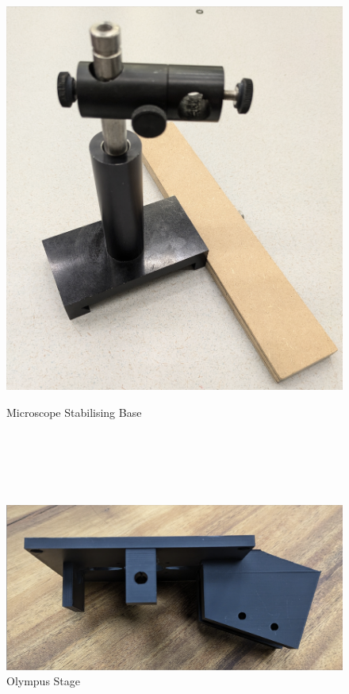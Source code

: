 \documentclass[runningheads]{llncs}
\begin{document}
\begin{figure}[h]
\begin{minipage}[b]{0.45\textwidth}
        \includegraphics[width=\textwidth]{images/stabilising_base.png} 
        \caption{Microscope Stabilising Base}
        \label{fig:StabilisingBase}
    \end{minipage}
    \\~\\
    \\~\\
    \centering
    \begin{minipage}[b]{0.5\textwidth}
        \centering
        \includegraphics[width=\textwidth]{images/microscope_stage.png} 
        \caption{Olympus Stage }

\end{minipage}
\end{figure}
\end{document}
